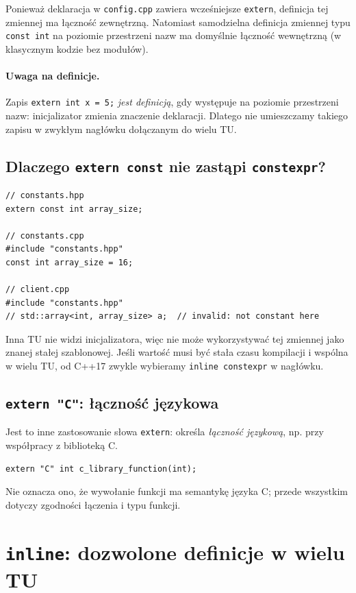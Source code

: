 Ponieważ deklaracja w \texttt{config.cpp} zawiera wcześniejsze
\texttt{extern}, definicja tej zmiennej ma łączność zewnętrzną.
Natomiast samodzielna definicja zmiennej typu \texttt{const int}
na poziomie przestrzeni nazw ma domyślnie łączność wewnętrzną
(w klasycznym kodzie bez modułów).

\paragraph{Uwaga na definicje.}
Zapis \texttt{extern int x = 5;} \emph{jest definicją}, gdy występuje
na poziomie przestrzeni nazw: inicjalizator zmienia znaczenie deklaracji.
Dlatego nie umieszczamy takiego zapisu w zwykłym nagłówku dołączanym
do wielu TU.

\subsection{Dlaczego \texttt{extern const} nie zastąpi \texttt{constexpr}?}

\begin{lstlisting}
// constants.hpp
extern const int array_size;

// constants.cpp
#include "constants.hpp"
const int array_size = 16;

// client.cpp
#include "constants.hpp"
// std::array<int, array_size> a;  // invalid: not constant here
\end{lstlisting}

Inna TU nie widzi inicjalizatora, więc nie może wykorzystywać tej
zmiennej jako znanej stałej szablonowej. Jeśli wartość musi być
stała czasu kompilacji i wspólna w wielu TU, od C++17 zwykle
wybieramy \texttt{inline constexpr} w nagłówku.

\subsection{\texttt{extern "C"}: łączność językowa}

Jest to inne zastosowanie słowa \texttt{extern}: określa
\emph{łączność językową}, np. przy współpracy z biblioteką C.

\begin{lstlisting}
extern "C" int c_library_function(int);
\end{lstlisting}

Nie oznacza ono, że wywołanie funkcji ma semantykę języka C;
przede wszystkim dotyczy zgodności łączenia i typu funkcji.

\section{\texttt{inline}: dozwolone definicje w wielu TU}

